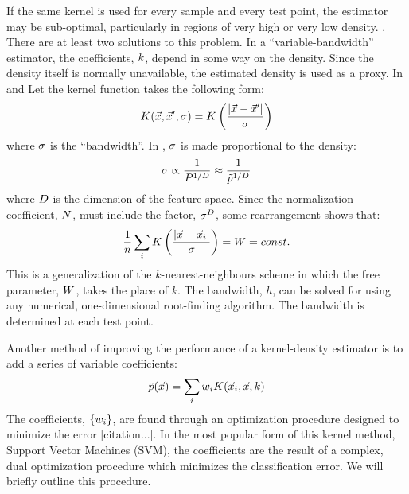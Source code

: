 \documentclass{article}
\begin{document}
If the same kernel is used for every sample and every test point, the estimator
may be sub-optimal, particularly in regions of very high or very low density.
\citep{Terrell_Scott1992, Mills2011}.
There are at least two solutions to this problem.
In a ``variable-bandwidth'' estimator, the coefficients, $k$, depend in some
way on the density. Since the density itself is normally unavailable, the
estimated density is used as a proxy. In \citet{Terrell_Scott1992} and
\citet{Mills2011} 
Let the kernel function takes the following form:
\begin{equation}
	K(\vec {x}, \vec {x}^\prime, \sigma) = K \left (\frac{|\vec {x} - \vec {x}^\prime|}{\sigma} \right )
\end{equation}
where $\sigma$ is the ``bandwidth''. 
In \citet{Mills2011}, $\sigma$ is made proportional to the density:
\begin{equation}
	\sigma \propto \frac{1}{P^{1/D}} \approx \frac{1}{\tilde p^{1/D}}
\end{equation}
where $D$ is the dimension of the feature space.
Since the normalization coefficient, $N$, must include the factor,
${\sigma^D}$, some rearrangement shows that:
\begin{equation}
	\frac{1}{n} \sum_i K \left (\frac{|\vec {x} - \vec {x}_i|}{\sigma} \right ) = W = const.
\end{equation}
This is a generalization of the $k$-nearest-neighbours scheme in which the
free parameter, $W$, takes the place of $k$. \citep{Mills2009, Mills2011}
The bandwidth, $h$, can be solved
for using any numerical, one-dimensional root-finding algorithm.
The bandwidth is determined at each test point.

Another method of improving the performance of a kernel-density estimator
is to add a series of variable coefficients:
\begin{equation}
	\tilde p(\vec {x}) = \sum_i w_i K(\vec {x}_i, \vec {x}, k)
\end{equation}
The coefficients, $\lbrace w_i \rbrace$, are found through an optimization
procedure designed to minimize the error [citation...]. In the most popular
form of this kernel method, Support Vector Machines (SVM), the coefficients
are the result of a complex, dual optimization procedure which minimizes
the classification error. We will briefly outline this procedure.
\end{document}

